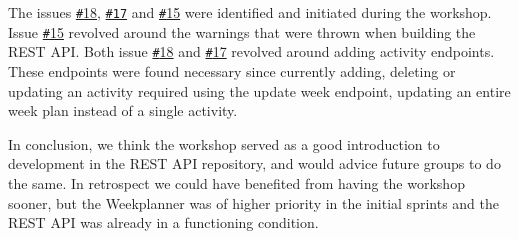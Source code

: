 The issues \href{https://github.com/aau-giraf/web-api/issues/18}{\texttt{\#}18}, \href{https://github.com/aau-giraf/web-api/issues/17}{\texttt{\#17}} and \href{https://github.com/aau-giraf/web-api/issues/15}{\texttt{\#}15} were identified and initiated during the workshop.
Issue \href{https://github.com/aau-giraf/web-api/issues/15}{\texttt{\#}15} revolved around the warnings that were thrown when building the REST API.
Both issue \href{https://github.com/aau-giraf/web-api/issues/18}{\texttt{\#}18} and \href{https://github.com/aau-giraf/web-api/issues/17}{\texttt{\#}17} revolved around adding activity endpoints.
These endpoints were found necessary since currently adding, deleting or updating an activity required using the update week endpoint, updating an entire week plan instead of a single activity. 
 
In conclusion, we think the workshop served as a good introduction to development in the REST API repository, and would advice future groups to do the same.
In retrospect we could have benefited from having the workshop sooner, but the Weekplanner was of higher priority in the initial sprints and the REST API was already in a functioning condition.

